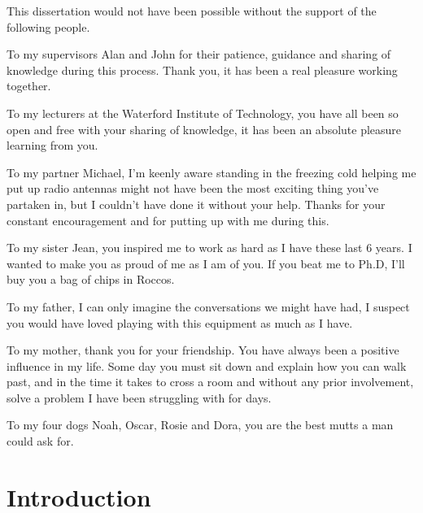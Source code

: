 \documentclass[runningheads,a4paper]{llncs}
\begin{document}
This dissertation would not have been possible without the support of the following people.

To my supervisors Alan and John for their patience, guidance and sharing of knowledge during this process.
Thank you, it has been a real pleasure working together.

To my lecturers at the Waterford Institute of Technology, you have all been so open and free with your
sharing of knowledge, it has been an absolute pleasure learning from you.

To my partner Michael, I'm keenly aware standing in the freezing cold helping me put up radio antennas 
might not have been the most exciting thing you've partaken in, but I couldn't have done it without your
help. Thanks for your constant encouragement and for putting up with me during this. 

To my sister Jean, you inspired me to work as hard as I have these last 6 years. I wanted to make you as
proud of me as I am of you. If you beat me to Ph.D, I'll buy you a bag of chips in Roccos.

To my father, I can only imagine the conversations we might have had, I suspect you would have loved
playing with this equipment as much as I have.

To my mother, thank you for your friendship. You have always been a positive influence in my life.
Some day you must sit down and explain how you can walk past, and in the time it takes to cross a room
and without any prior involvement, solve a problem I have been struggling with for days.

To my four dogs Noah, Oscar, Rosie and Dora, you are the best mutts a man could ask for.

%
\renewcommand*{\glsclearpage}{}
\printglossaries
%
\newpage
\tableofcontents
\newpage
\listoftables
{}
%
\newpage
\chapter*{Introduction}
\end{document}

